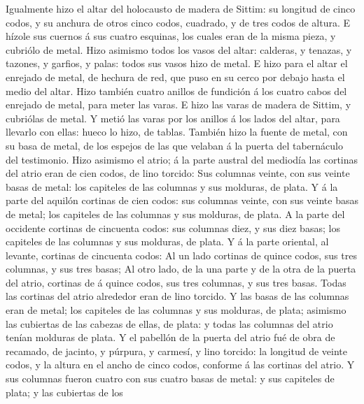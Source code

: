  Igualmente hizo el altar del holocausto de madera de
Sittim: su longitud de cinco codos, y su anchura de otros cinco codos,
cuadrado, y de tres codos de altura.  E hízole sus cuernos
á sus cuatro esquinas, los cuales eran de la misma pieza, y cubriólo de
metal.  Hizo asimismo todos los vasos del altar: calderas,
y tenazas, y tazones, y garfios, y palas: todos sus vasos hizo de metal.
 E hizo para el altar el enrejado de metal, de hechura de
red, que puso en su cerco por debajo hasta el medio del altar.
 Hizo también cuatro anillos de fundición á los cuatro
cabos del enrejado de metal, para meter las varas.  E hizo
las varas de madera de Sittim, y cubriólas de metal.  Y
metió las varas por los anillos á los lados del altar, para llevarlo con
ellas: hueco lo hizo, de tablas.  También hizo la fuente
de metal, con su basa de metal, de los espejos de las que velaban á la
puerta del tabernáculo del testimonio.  Hizo asimismo el
atrio; á la parte austral del mediodía las cortinas del atrio eran de
cien codos, de lino torcido:  Sus columnas veinte, con
sus veinte basas de metal: los capiteles de las columnas y sus molduras,
de plata.  Y á la parte del aquilón cortinas de cien
codos: sus columnas veinte, con sus veinte basas de metal; los capiteles
de las columnas y sus molduras, de plata.  A la parte del
occidente cortinas de cincuenta codos: sus columnas diez, y sus diez
basas; los capiteles de las columnas y sus molduras, de plata.
 Y á la parte oriental, al levante, cortinas de cincuenta
codos:  Al un lado cortinas de quince codos, sus tres
columnas, y sus tres basas;  Al otro lado, de la una
parte y de la otra de la puerta del atrio, cortinas de á quince codos,
sus tres columnas, y sus tres basas.  Todas las cortinas
del atrio alrededor eran de lino torcido.  Y las basas de
las columnas eran de metal; los capiteles de las columnas y sus
molduras, de plata; asimismo las cubiertas de las cabezas de ellas, de
plata: y todas las columnas del atrio tenían molduras de plata.
 Y el pabellón de la puerta del atrio fué de obra de
recamado, de jacinto, y púrpura, y carmesí, y lino torcido: la longitud
de veinte codos, y la altura en el ancho de cinco codos, conforme á las
cortinas del atrio.  Y sus columnas fueron cuatro con sus
cuatro basas de metal: y sus capiteles de plata; y las cubiertas de los
